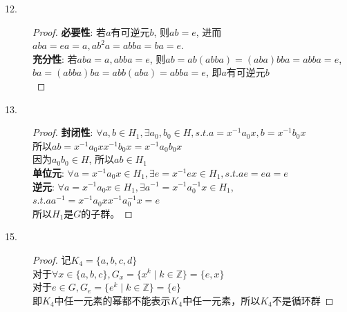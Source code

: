 \documentclass[UTF8, onecolumn, a4paper]{article}
\begin{document}
\begin{description}
\item[12.]
\begin{proof}
\textbf{必要性}: 若$a$有可逆元$b$, 则$ab = e$, 进而$aba = ea = a, ab^2a = abba = ba = e$.\\
\textbf{充分性}: 若$aba = a, abba = e$, 则$ab = ab(abba) = (aba)bba = abba = e$, $ba = (abba)ba = abb(aba) = abba = e$, 即$a$有可逆元$b$\\
\end{proof}

\item[13.]
\begin{proof}
\textbf{封闭性}: $\forall a, b\in H_1, \exists a_0, b_0\in H, s.t. a = x^{-1}a_0x, b = x^{-1}b_0x$\\
所以$ab = x^{-1}a_0xx^{-1}b_0x = x^{-1}a_0b_0x$\\
因为$a_0b_0\in H$, 所以$ab\in H_1$\\
\textbf{单位元}: $\forall a = x^{-1}a_0x\in H_1, \exists e = x^{-1}ex\in H_1, s.t. ae = ea  = e$\\
\textbf{逆元}: $\forall a = x^{-1}a_0x\in H_1, \exists a^{-1} = x^{-1}a_0^{-1}x\in H_1$, $s.t. aa^{-1} =x^{-1}a_0xx^{-1}a_0^{-1}x = e$\\
所以$H_1$是$G$的子群。
\end{proof}

\item[15.]
\begin{proof}记$K_4 = \{a, b, c, d\}$\\
对于$\forall x\in \{a, b, c\}, G_x = \{x^k\mid k\in \mathbb{Z}\} = \{e, x\}$\\
对于$e\in G, G_e = \{e^k\mid k\in \mathbb{Z}\}  =\{e\}$\\
即$K_4$中任一元素的幂都不能表示$K_4$中任一元素，所以$K_4$不是循环群
\end{proof}


\end{description}
\end{document}
